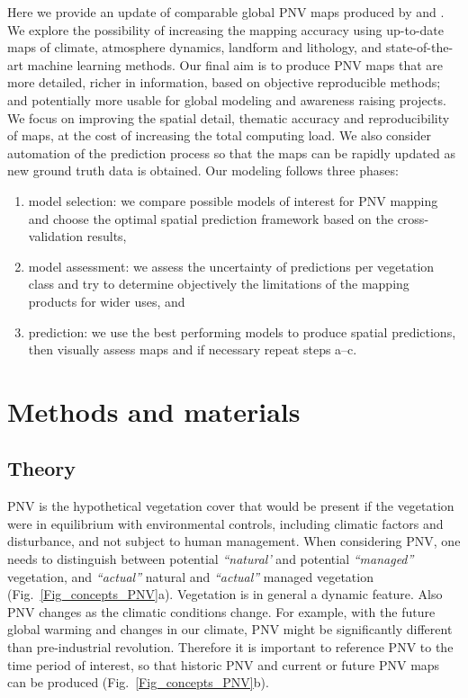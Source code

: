 \documentclass[fleqn,10pt,lineno]{wlpeerj} %
\begin{document}
Here we provide an update of comparable global PNV maps produced by \citet{Potapov2011,levavasseur2012statistical,tian2016terrestrial} and \citet{erb2017unexpectedly}. We explore the possibility of increasing the mapping accuracy using up-to-date maps of climate, atmosphere dynamics, landform and lithology, and state-of-the-art machine learning methods. Our final aim is to produce PNV maps that are more detailed, richer in information, based on objective reproducible methods; and potentially more usable for global modeling and awareness raising projects. We focus on improving the spatial detail, thematic accuracy and reproducibility of maps, at the cost of increasing the total computing load. We also consider automation of the prediction process so that the maps can be rapidly updated as new ground truth data is obtained. Our modeling follows three phases: 

\begin{enumerate}\renewcommand{\labelenumi}{(\alph{enumi})}
\item model selection: we compare possible models of interest for PNV mapping and choose the optimal spatial prediction framework based on the cross-validation results,
\item model assessment: we assess the uncertainty of predictions per vegetation class and try to determine objectively the limitations of the mapping products for wider uses, and
\item prediction: we use the best performing models to produce spatial predictions, then visually assess maps and if necessary repeat steps a--c.
\end{enumerate}

\section*{Methods and materials}

\subsection*{Theory}

PNV is the hypothetical vegetation cover that would be present if the vegetation were in equilibrium with environmental controls, including climatic factors and disturbance, and not subject to human management. When considering PNV, one needs to distinguish between potential \emph{``natural'} and potential \emph{``managed''} vegetation, and \emph{``actual''} natural and \emph{``actual''} managed vegetation (Fig.\@~\ref{Fig_concepts_PNV}a). Vegetation is in general a dynamic feature. Also PNV changes as the climatic conditions change. For example, with the future global warming and changes in our climate, PNV might be significantly different than pre-industrial revolution. Therefore it is important to reference PNV  to the time period of interest, so that historic PNV and current or future PNV maps can be produced (Fig.\@~\ref{Fig_concepts_PNV}b).\par
\end{document}
